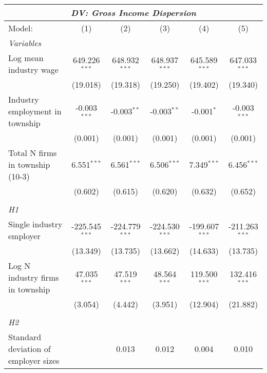 \begingroup
\centering
\begin{tabular}{lccccc}
   \tabularnewline \multicolumn{6}{c}{\textit{DV: Gross Income Dispersion}} \\ \midrule \midrule
   Model:                               & (1)              & (2)              & (3)              & (4)              & (5)\\  
   \midrule
   \emph{Variables}\\
   Log mean industry wage               & 649.226$^{***}$  & 648.932$^{***}$  & 648.937$^{***}$  & 645.589$^{***}$  & 647.033$^{***}$\\   
                                        & (19.018)         & (19.318)         & (19.250)         & (19.402)         & (19.340)\\   
   Industry employment in township      & -0.003$^{***}$   & -0.003$^{**}$    & -0.003$^{**}$    & -0.001$^{*}$     & -0.003$^{***}$\\   
                                        & (0.001)          & (0.001)          & (0.001)          & (0.001)          & (0.001)\\   
   Total N firms in township (10-3)     & 6.551$^{***}$    & 6.561$^{***}$    & 6.506$^{***}$    & 7.349$^{***}$    & 6.456$^{***}$\\   
                                        & (0.602)          & (0.615)          & (0.620)          & (0.632)          & (0.652)\\   
\hdashline %
\\[0.1ex] %
\emph{H1} \\ 
   Single industry employer             & -225.545$^{***}$ & -224.779$^{***}$ & -224.530$^{***}$ & -199.607$^{***}$ & -211.263$^{***}$\\   
                                        & (13.349)         & (13.735)         & (13.662)         & (14.633)         & (13.735)\\   
   Log N industry firms in township     & 47.035$^{***}$   & 47.519$^{***}$   & 48.564$^{***}$   & 119.500$^{***}$  & 132.416$^{***}$\\   
                                        & (3.054)          & (4.442)          & (3.951)          & (12.904)         & (21.882)\\   
\hdashline %
\\[0.1ex] %
\emph{H2} \\ 
   Standard deviation of employer sizes &                  & 0.013            & 0.012            & 0.004            & 0.010\\   

\end{tabular}
